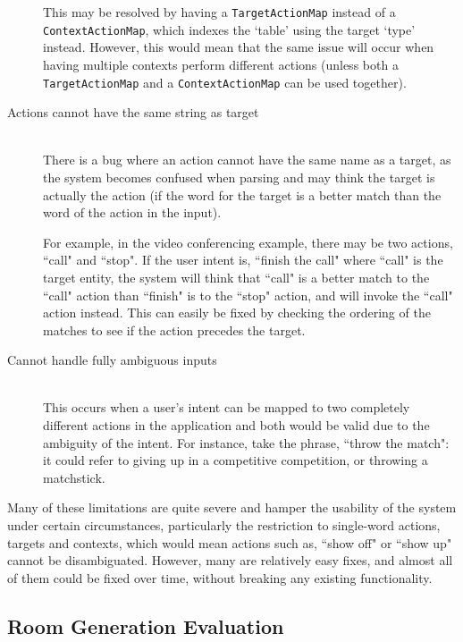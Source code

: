 \documentclass[11pt]{article}
\begin{document}
\begin{description}
	This may be resolved by having a \texttt{TargetActionMap} instead of a \texttt{ContextActionMap}, which indexes the `table' using the target `type' instead. However, this would mean that the same issue will occur when having multiple contexts perform different actions (unless both a \texttt{TargetActionMap} and a \texttt{ContextActionMap} can be used together).
\item[Actions cannot have the same string as target] \hfill
	\\ There is a bug where an action cannot have the same name as a target, as the system becomes confused when parsing and may think the target is actually the action (if the word for the target is a better match than the word of the action in the input).
	
	For example, in the video conferencing example, there may be two actions, ``call" and ``stop". If the user intent is, ``finish the call" where ``call" is the target entity, the system will think that ``call" is a better match to the ``call" action than ``finish" is to the ``stop" action, and will invoke the ``call" action instead. This can easily be fixed by checking the ordering of the matches to see if the action precedes the target.
\item[Cannot handle fully ambiguous inputs] \hfill
	\\ This occurs when a user's intent can be mapped to two completely different actions in the application and both would be valid due to the ambiguity of the intent. For instance, take the phrase, ``throw the match": it could refer to giving up in a competitive competition, or throwing a matchstick.
\end{description}

Many of these limitations are quite severe and hamper the usability of the system under certain circumstances, particularly the restriction to single-word actions, targets and contexts, which would mean actions such as, ``show off" or ``show up" cannot be disambiguated. However, many are relatively easy fixes, and almost all of them could be fixed over time, without breaking any existing functionality.

\subsection{Room Generation Evaluation}
\end{document}
